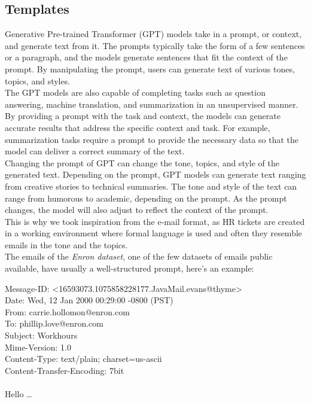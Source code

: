 \subsection*{Templates}
\label{sec:templates}
Generative Pre-trained Transformer (GPT) \cite{radford2018improving} models take in a prompt, or context, and generate text from it. The prompts typically take the form of a few sentences or a paragraph, and the models generate sentences that fit the context of the prompt. By manipulating the prompt, users can generate text of various tones, topics, and styles. \\
The GPT models are also capable of completing tasks such as question answering, machine translation, and summarization in an unsupervised manner\cite{radford2019language}. By providing a prompt with the task and context, the models can generate accurate results that address the specific context and task. For example, summarization tasks require a prompt to provide the necessary data so that the model can deliver a correct summary of the text. \\
Changing the prompt of GPT can change the tone, topics, and style of the generated text. Depending on the prompt, GPT models can generate text ranging from creative stories to technical summaries. The tone and style of the text can range from humorous to academic, depending on the prompt. As the prompt changes, the model will also adjust to reflect the context of the prompt. \\
This is why we took inspiration from the e-mail format, as HR tickets are created in a working environment where formal language is used and often they resemble emails in the tone and the topics. \\
The emails of the \textit{Enron dataset}, one of the few datasets of emails public available, have usually a well-structured prompt, here's an example: 
\begin{adjustwidth}{1cm}{}
    Message-ID: <16593073.1075858228177.JavaMail.evans@thyme>\\
    Date: Wed, 12 Jan 2000 00:29:00 -0800 (PST) \\
    From: carrie.hollomon@enron.com\\
    To: phillip.love@enron.com\\
    Subject: Workhours\\
    Mime-Version: 1.0\\
    Content-Type: text/plain; charset=us-ascii\\
    Content-Transfer-Encoding: 7bit\\\\
    Hello \dots
\end{adjustwidth}
